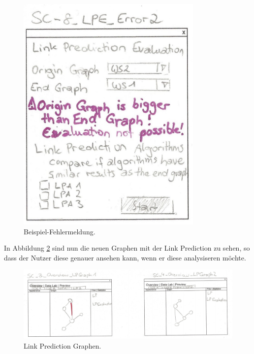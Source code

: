 \begin{figure}
    \includegraphics[width=\linewidth]{resources/EV-5.png}
    \caption{Beispiel-Fehlermeldung.}
    \label{fig:screen11}
\end{figure}

In Abbildung \ref{fig:screen12}  sind nun die neuen Graphen mit der Link Prediction zu sehen, so dass der Nutzer diese genauer ansehen
kann, wenn er diese analysiseren möchte.

\begin{figure}
    \includegraphics[width=\linewidth]{resources/EV-2.png}
    \caption{Link Prediction Graphen.}
    \label{fig:screen12}
\end{figure}

